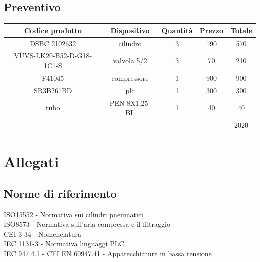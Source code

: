 \documentclass[12pt]{article}
\begin{document}
\subsection{Preventivo}
\begin{table}[H]
	\centering
	\begin{tabular}{|c|c|c|c|c|} \hline
		\rowcolor{ForestGreen!70} Codice prodotto           & Dispositivo   & Quantità & Prezzo & Totale \\
		\hline
		\rowcolor{SpringGreen!80} DSBC 2102632              & cilindro      & 3        & 190    & 570    \\
		\hline
		\rowcolor{LimeGreen!80}   VUVS-LK20-B52-D-G18-1C1-S & valvola 5/2   & 3        & 70     & 210    \\
		\hline
		\rowcolor{SpringGreen!80} F41045                    & compressore   & 1        & 900    & 900    \\
		\hline
		\rowcolor{LimeGreen!80}   SR3B261BD                 & plc           & 1        & 300    & 300    \\
		\hline
		\rowcolor{SpringGreen!80} tubo                      & PEN-8X1,25-BL & 1        & 40     & 40     \\
		\hline
		\hline
		\rowcolor{LimeGreen!40}                             &               &          &        & 2020   \\
		\hline
	\end{tabular}
\end{table}
\newpage
\section{Allegati}
\subsection{Norme di riferimento}
ISO15552 - Normativa sui cilindri pneumatici\\
ISO8573  - Normativa sull'aria compressa e il filtraggio\\
CEI 3-34 - Nomenclatura\\
IEC 1131-3 - Normativa linguaggi PLC\\
IEC 947.4.1 - CEI EN 60947.41 - Apparecchiature in bassa tensione \\
\end{document}

